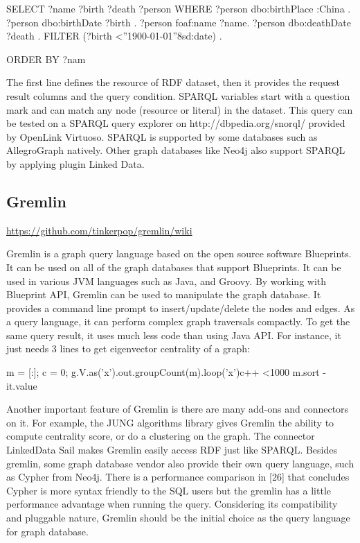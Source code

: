   SELECT ?name ?birth ?death ?person WHERE {
    ?person dbo:birthPlace :China .
    ?person dbo:birthDate ?birth .
    ?person foaf:name ?name.
    ?person dbo:deathDate ?death .
    FILTER (?birth <”1900-01-01”8sd:date) .
  }

  ORDER BY ?nam

  The first line defines the resource of RDF dataset, then it provides
  the request result columns and the query condition. SPARQL variables
  start with a question mark and can match any node (resource or
  literal) in the dataset. This query can be tested on a SPARQL query
  explorer on http://dbpedia.org/snorql/ provided by OpenLink
  Virtuoso.  SPARQL is supported by some databases such as
  AllegroGraph natively. Other graph databases like Neo4j also support
  SPARQL by applying plugin Linked Data.

  \subsection{Gremlin}
  \label{gremlin}

  {\color{red}
    \url{https://github.com/tinkerpop/gremlin/wiki}
  }

  Gremlin is a graph query language based on the open source software
  Blueprints.  It can be used on all of the graph databases that
  support Blueprints. It can be used in various JVM languages such as
  Java, and Groovy. By working with Blueprint API, Gremlin can be used
  to manipulate the graph database. It provides a command line prompt
  to insert/update/delete the nodes and edges. As a query language, it
  can perform complex graph traversals compactly. To get the same
  query result, it uses much less code than using Java API. For
  instance, it just needs 3 lines to get eigenvector centrality of a
  graph:

  m = [:]; c = 0;
  g.V.as(’x’).out.groupCount(m).loop(’x’){c++ <1000}
  m.sort { -it.value }


  Another important feature of Gremlin is there are many add-ons and
  connectors on it. For example, the JUNG algorithms library gives
  Gremlin the ability to compute centrality score, or do a clustering
  on the graph. The connector LinkedData Sail makes Gremlin easily
  access RDF just like SPARQL. Besides gremlin, some graph database
  vendor also provide their own query language, such as Cypher from
  Neo4j. There is a performance comparison in [26] that concludes
  Cypher is more syntax friendly to the SQL users but the gremlin has
  a little performance advantage when running the query.  Considering
  its compatibility and pluggable nature, Gremlin should be the
  initial choice as the query language for graph database.

